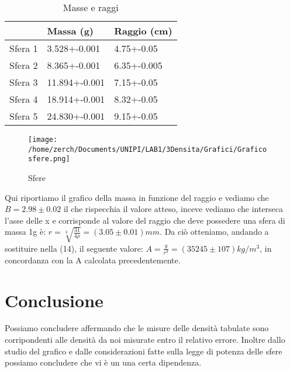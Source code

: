 \documentclass[a4paper,10pt]{article}
\begin{document}
\begin{table}[!htb]
\centering
\caption{Masse e raggi}
\label{my-label}
\begin{tabular}{|l|l|l|}
\hline
        & Massa (g)     & Raggio (cm) \\ \hline
Sfera 1 & 3.528+-0.001  & 4.75+-0.05  \\ \hline
Sfera 2 & 8.365+-0.001  & 6.35+-0.005 \\ \hline
Sfera 3 & 11.894+-0.001 & 7.15+-0.05  \\ \hline
Sfera 4 & 18.914+-0.001 & 8.32+-0.05  \\ \hline
Sfera 5 & 24.830+-0.001 & 9.15+-0.05  \\ \hline
\end{tabular}
\end{table}
\begin{figure}[!htb]
\begin{center}
 \centering
 \caption{Sfere}
 \texttt{[image: /home/zerch/Documents/UNIPI/LAB1/3Densita/Grafici/Grafico sfere.png]}
 \end{center}
\end{figure}
Qui riportiamo il grafico della massa in funzione del raggio e vediamo che $B=2.98 \pm 0.02$ il che rispecchia il valore atteso, inceve vediamo che interseca l'asse delle x
e corrisponde al valore del raggio che deve possedere una sfera di massa 1g è: $r=\sqrt[3]{\frac{3  1}{4  \rho}}=(3.05 \pm 0.01)mm$.
Da ciò otteniamo, andando a sostituire nella (14), il seguente valore: $A=\frac{y}{r^3}=(35245 \pm 107)kg/m^3$, in concordanza con la A calcolata precedentemente.
\section{Conclusione}
Possiamo concludere affermando che le misure delle densità tabulate sono corripondenti alle densità da noi misurate entro il relativo errore.
Inoltre dallo studio del grafico e dalle considerazioni fatte sulla legge di potenza delle sfere possiamo concludere che vi è un una certa dipendenza.
\end{document}
